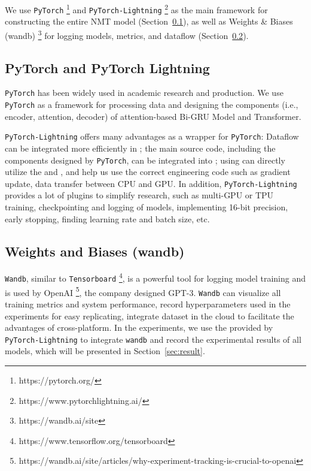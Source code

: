 We use \texttt{PyTorch} \footnote{https://pytorch.org/} and \texttt{PyTorch-Lightning} \footnote{https://www.pytorchlightning.ai/} \cite{falcon2019pytorch}  as the main framework for constructing the entire NMT model (Section~\ref{sec:lightning}), as well as Weights \& Biases (wandb) \footnote{https://wandb.ai/site} \cite{wandb} for logging models, metrics, and dataflow (Section~\ref{sec:wandb}).

\subsection{PyTorch and PyTorch Lightning} \label{sec:lightning}

\texttt{PyTorch} has been widely used in academic research and production. We use \texttt{PyTorch} as a framework for processing data and designing the components (i.e., encoder, attention, decoder) of attention-based Bi-GRU Model and Transformer.

\texttt{PyTorch-Lightning} offers many advantages as a wrapper for \texttt{PyTorch}: Dataflow can be integrated more efficiently in ; the main source code, including the components designed by \texttt{PyTorch}, can be integrated into ; using  can directly utilize the  and , and help us use the correct engineering code such as gradient update, data transfer between CPU and GPU. In addition, \texttt{PyTorch-Lightning} provides a lot of plugins to simplify research, such as multi-GPU or TPU training, checkpointing and logging of models, implementing 16-bit precision, early stopping, finding learning rate and batch size, etc.

\subsection{Weights and Biases (wandb)} \label{sec:wandb}

\texttt{Wandb}, similar to \texttt{Tensorboard} \footnote{https://www.tensorflow.org/tensorboard}, is a powerful tool for logging model training and is used by OpenAI \footnote{https://wandb.ai/site/articles/why-experiment-tracking-is-crucial-to-openai}, the company designed GPT-3. \texttt{Wandb} can visualize all training metrics and system performance, record hyperparameters used in the experiments for easy replicating, integrate dataset in the cloud to facilitate the advantages of cross-platform. In the experiments, we use the  provided by \texttt{PyTorch-Lightning} to integrate \texttt{wandb} and record the experimental results of all models, which will be presented in Section~\ref{sec:result}.

